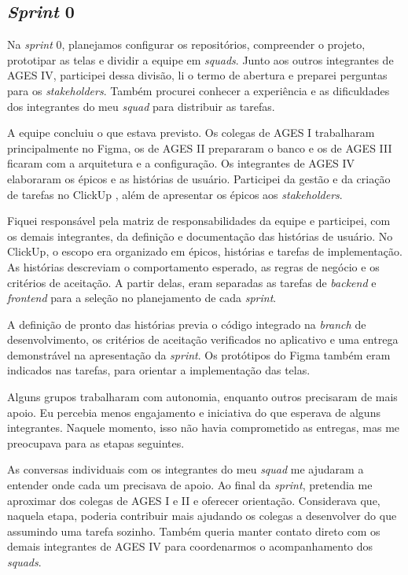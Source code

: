 \subsection{\textit{Sprint} 0}

Na \textit{sprint} 0, planejamos configurar os repositórios, compreender o
projeto, prototipar as telas e dividir a equipe em \textit{squads}. Junto aos
outros integrantes de AGES IV, participei dessa divisão, li o termo de abertura
e preparei perguntas para os \textit{stakeholders}. Também procurei conhecer a
experiência e as dificuldades dos integrantes do meu \textit{squad} para
distribuir as tarefas.

A equipe concluiu o que estava previsto. Os colegas de AGES I trabalharam
principalmente no Figma, os de AGES II prepararam o banco e os de AGES III
ficaram com a arquitetura e a configuração. Os integrantes de AGES IV
elaboraram os épicos e as histórias de usuário. Participei da gestão e da
criação de tarefas no ClickUp \cite{clickup-site}, além de apresentar os
épicos aos \textit{stakeholders}.

Fiquei responsável pela matriz de responsabilidades da equipe e participei,
com os demais integrantes, da definição e documentação das histórias de
usuário. No ClickUp, o escopo era organizado em épicos, histórias e tarefas
de implementação. As histórias descreviam o comportamento esperado, as
regras de negócio e os critérios de aceitação. A partir delas, eram
separadas as tarefas de \textit{backend} e \textit{frontend} para a
seleção no planejamento de cada \textit{sprint}.

A definição de pronto das histórias previa o código integrado na
\textit{branch} de desenvolvimento, os critérios de aceitação verificados
no aplicativo e uma entrega demonstrável na apresentação da
\textit{sprint}. Os protótipos do Figma também eram indicados nas tarefas,
para orientar a implementação das telas.

Alguns grupos trabalharam com autonomia, enquanto outros precisaram de mais
apoio. Eu percebia menos engajamento e iniciativa do que esperava de alguns
integrantes. Naquele momento, isso não havia comprometido as entregas, mas me
preocupava para as etapas seguintes.

As conversas individuais com os integrantes do meu \textit{squad} me ajudaram
a entender onde cada um precisava de apoio. Ao final da \textit{sprint},
pretendia me aproximar dos colegas de AGES I e II e oferecer orientação.
Considerava que, naquela etapa, poderia contribuir mais ajudando os colegas
a desenvolver do que assumindo uma tarefa sozinho. Também queria manter
contato direto com os demais integrantes de AGES IV para coordenarmos o
acompanhamento dos \textit{squads}.
